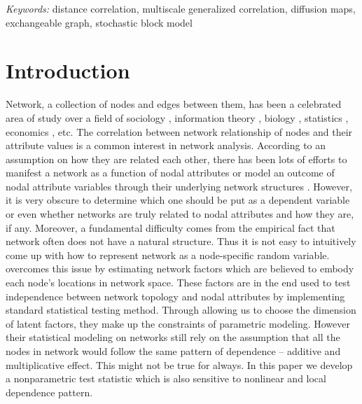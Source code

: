 \documentclass[12pt]{article}
\theoremstyle{definition}
\begin{document}
	\noindent%
	{\it Keywords:} distance correlation, multiscale generalized correlation, diffusion maps, exchangeable graph, stochastic block model 
	\vfill
	
	\newpage
	\section{Introduction}
	\label{sec:intro}

Network, a collection of nodes and edges between them, has been a celebrated area of study over a field of sociology \citep{pinquart2000influences, ellison2007benefits}, information theory \citep{gross2005information}, biology \citep{barabasi2004network, pujol2010unveiling}, statistics \citep{raftery2012fast, palla2012infinite}, economics \citep{banerjee2013diffusion}, etc. The correlation between network relationship of nodes and their attribute values is a common interest in network analysis. According to an assumption on how they are related each other, there has been lots of efforts to manifest a network as a function of nodal attributes \citep{wasserman1996logit, howard2016understanding} or model an outcome of nodal attribute variables through their underlying network structures \citep{christakis2007spread, christakis2008collective}. However, it is very obscure to determine which one should be put as a dependent variable or even whether networks are truly related to nodal attributes and how they are, if any. Moreover, a fundamental difficulty comes from the empirical fact that network often does not have a natural structure. Thus it is not easy to intuitively come up with how to represent network as a node-specific random variable. \cite{fosdick2015testing} overcomes this issue by estimating network factors which are believed to embody each node's locations in network space. These factors are in the end used to test independence between network topology and nodal attributes by implementing standard statistical testing method. Through allowing us to choose the dimension of latent factors, they make up the constraints of parametric modeling. However their statistical modeling on networks still rely on the assumption that all the nodes in network would follow the same pattern of dependence -- additive and multiplicative effect. This might not be true for always. In this paper we develop a nonparametric test statistic which is also sensitive to nonlinear and local dependence pattern.  
\end{document}
